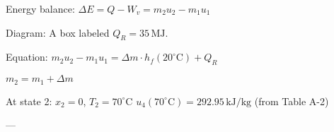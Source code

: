 Energy balance:  
\( \Delta E = Q - W_v = m_2 u_2 - m_1 u_1 \)  

Diagram: A box labeled \( Q_R = 35 \, \text{MJ} \).  

Equation:  
\( m_2 u_2 - m_1 u_1 = \Delta m \cdot h_f(20^\circ \text{C}) + Q_R \)  

\( m_2 = m_1 + \Delta m \)  

At state 2:  
\( x_2 = 0 \), \( T_2 = 70^\circ \text{C} \)  
\( u_4(70^\circ \text{C}) = 292.95 \, \text{kJ/kg} \) (from Table A-2)  

---